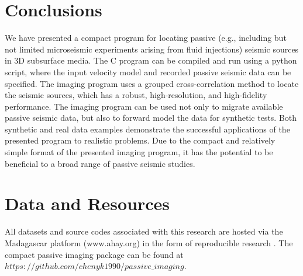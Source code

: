 
\section{Conclusions}
We have presented a compact program for locating passive (e.g., including but not limited  microseismic experiments arising from fluid injections) seismic sources in 3D subsurface media. The C program can be compiled and run using a python script, where the input velocity model and recorded passive seismic data can be specified. The imaging program uses a grouped cross-correlation method to locate the seismic sources, which has a robust, high-resolution, and high-fidelity performance. The imaging program can be used not only to migrate available passive seismic data, but also to forward model the data for synthetic tests. Both synthetic and real data examples demonstrate the successful applications of the presented program to realistic problems. Due to the compact and relatively simple format of the presented imaging program, it has the potential to be beneficial to a broad range of passive seismic studies. 

\section{Data and Resources}
All datasets and source codes associated with this research are hosted via the Madagascar platform (www.ahay.org) in the form of reproducible research \cite[]{mada2013}. The compact passive imaging package can be found at \\
$https://github.com/chenyk1990/passive\_imaging$.



